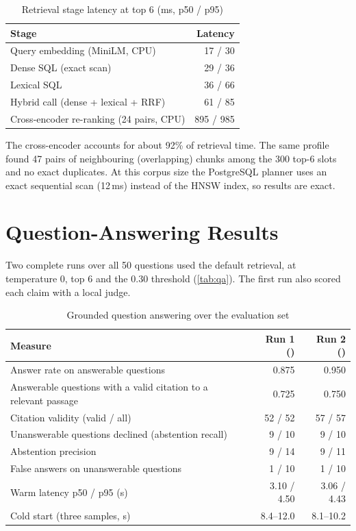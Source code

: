 \begin{table}[htbp]
  \centering
  \caption{Retrieval stage latency at top 6 (ms, p50 / p95)}\label{tab:profile}
  {\small
  \begin{tabular}{@{}lr@{}}
    \toprule
    \textbf{Stage} & \textbf{Latency} \\
    \midrule
    Query embedding (MiniLM, CPU) & 17 / 30 \\
    Dense SQL (exact scan) & 29 / 36 \\
    Lexical SQL & 36 / 66 \\
    Hybrid call (dense + lexical + RRF) & 61 / 85 \\
    Cross-encoder re-ranking (24 pairs, CPU) & 895 / 985 \\
    \bottomrule
  \end{tabular}
  }
\end{table}

The cross-encoder accounts for about 92\% of retrieval time. The same profile found 47 pairs of neighbouring
(overlapping) chunks among the 300 top-6 slots and no exact duplicates. At this corpus size the PostgreSQL planner
uses an exact sequential scan (12\,ms) instead of the HNSW index, so results are exact.

\section{Question-Answering Results}

Two complete runs over all 50 questions used the default retrieval,  at temperature 0, top 6 and the
0.30 threshold (\autoref{tab:qa}). The first run also scored each claim with a local judge.

\begin{table}[htbp]
  \centering
  \caption{Grounded question answering over the evaluation set}\label{tab:qa}
  {\small
  \begin{tabularx}{\textwidth}{@{}Lrr@{}}
    \toprule
    \textbf{Measure} & \textbf{Run 1 ()} & \textbf{Run 2 ()} \\
    \midrule
    Answer rate on answerable questions & 0.875 & 0.950 \\
    Answerable questions with a valid citation to a relevant passage & 0.725 & 0.750 \\
    Citation validity (valid / all) & 52 / 52 & 57 / 57 \\
    Unanswerable questions declined (abstention recall) & 9 / 10 & 9 / 10 \\
    Abstention precision & 9 / 14 & 9 / 11 \\
    False answers on unanswerable questions & 1 / 10 & 1 / 10 \\
    Warm latency p50 / p95 (s) & 3.10 / 4.50 & 3.06 / 4.43 \\
    Cold start (three samples, s) & 8.4--12.0 & 8.1--10.2 \\
    \bottomrule
  \end{tabularx}
  }
\end{table}

